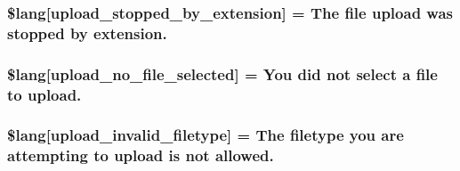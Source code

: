\subsubsection[{\$lang}]{\setlength{\rightskip}{0pt plus 5cm}\$lang\mbox{[}\textquotesingle{}upload\+\_\+stopped\+\_\+by\+\_\+extension\textquotesingle{}\mbox{]} = \textquotesingle{}The file upload was stopped by extension.\textquotesingle{}}\label{_admin_2system_2language_2english_2upload__lang_8php_ae97257deea3dddb33be4bbc6510a464b}
\hypertarget{_admin_2system_2language_2english_2upload__lang_8php_a88d8e8f9b879d1c25e6c089f3d3b5a30}{}
\subsubsection[{\$lang}]{\setlength{\rightskip}{0pt plus 5cm}\$lang\mbox{[}\textquotesingle{}upload\+\_\+no\+\_\+file\+\_\+selected\textquotesingle{}\mbox{]} = \textquotesingle{}You did not select {\bf a} file to upload.\textquotesingle{}}\label{_admin_2system_2language_2english_2upload__lang_8php_a88d8e8f9b879d1c25e6c089f3d3b5a30}
\hypertarget{_admin_2system_2language_2english_2upload__lang_8php_ac8631aa85ed80396bd78e91a76d5fd38}{}
\subsubsection[{\$lang}]{\setlength{\rightskip}{0pt plus 5cm}\$lang\mbox{[}\textquotesingle{}upload\+\_\+invalid\+\_\+filetype\textquotesingle{}\mbox{]} = \textquotesingle{}The filetype you are attempting to upload is not allowed.\textquotesingle{}}\label{_admin_2system_2language_2english_2upload__lang_8php_ac8631aa85ed80396bd78e91a76d5fd38}
\hypertarget{_admin_2system_2language_2english_2upload__lang_8php_a832b3ec1d84b1d48a488cf525954d8f2}{}
